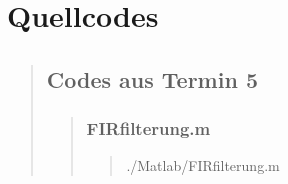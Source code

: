 \section{Quellcodes}
\begin{quote}

	\subsection{Codes aus Termin 5}
	\begin{quote}
	    \subsubsection{FIRfilterung.m}
	    \begin{quote}
	        
	            {./Matlab/FIRfilterung.m}
	    \end{quote}
	\end{quote}
\end{quote}









